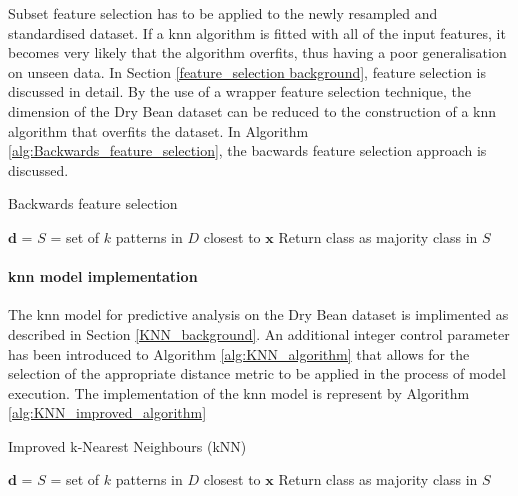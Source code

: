 \documentclass[10pt, conference]{IEEEtran}
\begin{document}
Subset feature selection has to be applied to the newly resampled and standardised dataset. If a \acrshort{knn} algorithm
is fitted with all of the input features, it becomes very likely that the algorithm overfits, thus having a poor
generalisation on unseen data. In Section \ref{feature_selection background}, feature selection is discussed in detail.
By the use of a wrapper feature selection technique, the dimension of the Dry Bean dataset can be reduced to the
construction of a \acrshort{knn} algorithm that overfits the dataset. In Algorithm \ref{alg:Backwards_feature_selection},
the bacwards feature selection approach is discussed.
\begin{algorithm}
    \caption{Backwards feature selection}
    \label{alg:Backwards_feature_selection}
    \begin{algorithmic}[1]
                \State $\boldsymbol{\textbf{d}}$ = 
            \EndFor
            \State {}
            \State $S$ = set of $k$ patterns in $D$ closest to $\boldsymbol{\textbf{x}}$
            \State Return class as majority class in $S$
        \EndFunction
    \end{algorithmic}
\end{algorithm}

\paragraph{\acrshort{knn} model implementation}

The \acrshort{knn} model for predictive analysis on the Dry Bean dataset is implimented as described
in Section \ref{KNN_background}. An additional integer control parameter has been introduced to
Algorithm \ref{alg:KNN_algorithm} that allows for the selection of the appropriate distance metric
to be applied in the process of model execution. The implementation of the \acrshort{knn} model is represent
by Algorithm \ref{alg:KNN_improved_algorithm}
\begin{algorithm}
    \caption{Improved k-Nearest Neighbours (kNN)}
    \label{alg:KNN_improved_algorithm}
    \begin{algorithmic}[1]
                \State $\boldsymbol{\textbf{d}}$ = 
            \EndFor
            \State {}
            \State $S$ = set of $k$ patterns in $D$ closest to $\boldsymbol{\textbf{x}}$
            \State Return class as majority class in $S$
        \EndFunction
    \end{algorithmic}
\end{algorithm}
\end{document}
